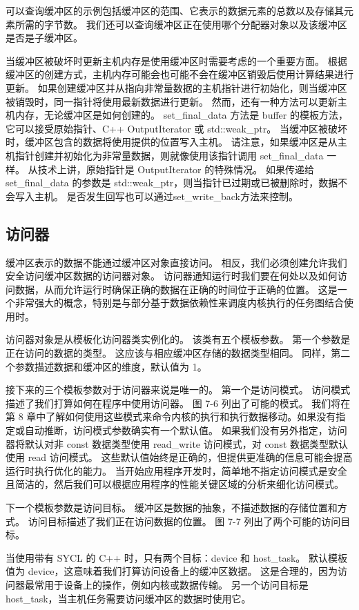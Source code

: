可以查询缓冲区的示例包括缓冲区的范围、它表示的数据元素的总数以及存储其元素所需的字节数。 我们还可以查询缓冲区正在使用哪个分配器对象以及该缓冲区是否是子缓冲区。

当缓冲区被破坏时更新主机内存是使用缓冲区时需要考虑的一个重要方面。 根据缓冲区的创建方式，主机内存可能会也可能不会在缓冲区销毁后使用计算结果进行更新。 如果创建缓冲区并从指向非常量数据的主机指针进行初始化，则当缓冲区被销毁时，同一指针将使用最新数据进行更新。 然而，还有一种方法可以更新主机内存，无论缓冲区是如何创建的。 set\_final\_data 方法是 buffer 的模板方法，它可以接受原始指针、C++ OutputIterator 或 std::weak\_ptr。 当缓冲区被破坏时，缓冲区包含的数据将使用提供的位置写入主机。 请注意，如果缓冲区是从主机指针创建并初始化为非常量数据，则就像使用该指针调用 set\_final\_data 一样。 从技术上讲，原始指针是 OutputIterator 的特殊情况。 如果传递给 set\_final\_data 的参数是 std::weak\_ptr，则当指针已过期或已被删除时，数据不会写入主机。 是否发生回写也可以通过set\_write\_back方法来控制。

\subsection{访问器}
缓冲区表示的数据不能通过缓冲区对象直接访问。 相反，我们必须创建允许我们安全访问缓冲区数据的访问器对象。 访问器通知运行时我们要在何处以及如何访问数据，从而允许运行时确保正确的数据在正确的时间位于正确的位置。 这是一个非常强大的概念，特别是与部分基于数据依赖性来调度内核执行的任务图结合使用时。

访问器对象是从模板化访问器类实例化的。 该类有五个模板参数。 第一个参数是正在访问的数据的类型。 这应该与相应缓冲区存储的数据类型相同。 同样，第二个参数描述数据和缓冲区的维度，默认值为 1。

接下来的三个模板参数对于访问器来说是唯一的。 第一个是访问模式。 访问模式描述了我们打算如何在程序中使用访问器。 图 7-6 列出了可能的模式。 我们将在第 8 章中了解如何使用这些模式来命令内核的执行和执行数据移动。如果没有指定或自动推断，访问模式参数确实有一个默认值。 如果我们没有另外指定，访问器将默认对非 const 数据类型使用 read\_write 访问模式，对 const 数据类型默认使用 read 访问模式。 这些默认值始终是正确的，但提供更准确的信息可能会提高运行时执行优化的能力。 当开始应用程序开发时，简单地不指定访问模式是安全且简洁的，然后我们可以根据应用程序的性能关键区域的分析来细化访问模式。

下一个模板参数是访问目标。 缓冲区是数据的抽象，不描述数据的存储位置和方式。 访问目标描述了我们正在访问数据的位置。 图 7-7 列出了两个可能的访问目标。

当使用带有 SYCL 的 C++ 时，只有两个目标：device 和 host\_task。 默认模板值为 device，这意味着我们打算访问设备上的缓冲区数据。 这是合理的，因为访问器最常用于设备上的操作，例如内核或数据传输。 另一个访问目标是 host\_task，当主机任务需要访问缓冲区的数据时使用它。

